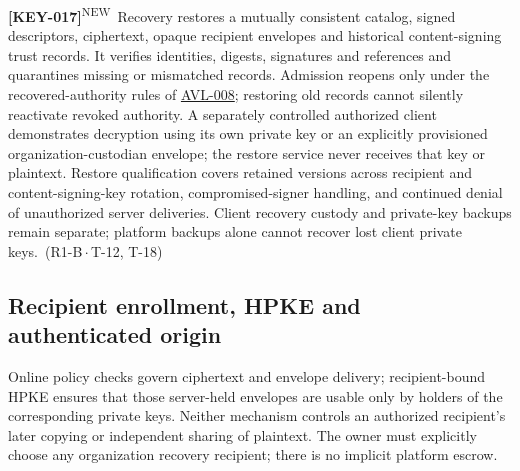 \documentclass[11pt,a4paper]{article}
\newcommand{\rr}[1]{\hyperlink{req:#1}{#1}}
\newcommand{\reqtag}[2]{{\footnotesize\color{accent}(#1\,$\cdot$\,#2)}}
\newcommand{\reqn}[4]{\par\noindent\hypertarget{req:#1}{\textbf{[#1]}}\textsuperscript{\color{accent}\tiny NEW}\ #4\ \reqtag{#2}{#3}\par}
\begin{document}
\reqn{KEY-017}{R1-B}{T-12, T-18}{Recovery restores a mutually consistent catalog, signed descriptors, ciphertext, opaque recipient envelopes and historical content-signing trust records. It verifies identities, digests, signatures and references and quarantines missing or mismatched records. Admission reopens only under the recovered-authority rules of \rr{AVL-008}; restoring old records cannot silently reactivate revoked authority. A separately controlled authorized client demonstrates decryption using its own private key or an explicitly provisioned organization-custodian envelope; the restore service never receives that key or plaintext. Restore qualification covers retained versions across recipient and content-signing-key rotation, compromised-signer handling, and continued denial of unauthorized server deliveries. Client recovery custody and private-key backups remain separate; platform backups alone cannot recover lost client private keys.}

\subsection{Recipient enrollment, HPKE and authenticated origin}
Online policy checks govern ciphertext and envelope delivery; recipient-bound HPKE ensures that those server-held envelopes are usable only by holders of the corresponding private keys. Neither mechanism controls an authorized recipient's later copying or independent sharing of plaintext. The owner must explicitly choose any organization recovery recipient; there is no implicit platform escrow.
\end{document}
